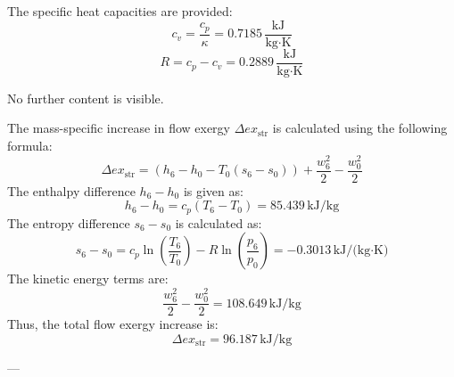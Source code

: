 The specific heat capacities are provided:  
\[
c_v = \frac{c_p}{\kappa} = 0.7185 \, \frac{\text{kJ}}{\text{kg·K}}
\]  
\[
R = c_p - c_v = 0.2889 \, \frac{\text{kJ}}{\text{kg·K}}
\]  

No further content is visible.

The mass-specific increase in flow exergy \( \Delta ex_{\text{str}} \) is calculated using the following formula:  
\[
\Delta ex_{\text{str}} = (h_6 - h_0 - T_0(s_6 - s_0)) + \frac{w_6^2}{2} - \frac{w_0^2}{2}
\]  
The enthalpy difference \( h_6 - h_0 \) is given as:  
\[
h_6 - h_0 = c_p(T_6 - T_0) = 85.439 \, \text{kJ/kg}
\]  
The entropy difference \( s_6 - s_0 \) is calculated as:  
\[
s_6 - s_0 = c_p \ln\left(\frac{T_6}{T_0}\right) - R \ln\left(\frac{p_6}{p_0}\right) = -0.3013 \, \text{kJ/(kg·K)}
\]  
The kinetic energy terms are:  
\[
\frac{w_6^2}{2} - \frac{w_0^2}{2} = 108.649 \, \text{kJ/kg}
\]  
Thus, the total flow exergy increase is:  
\[
\Delta ex_{\text{str}} = 96.187 \, \text{kJ/kg}
\]  

---